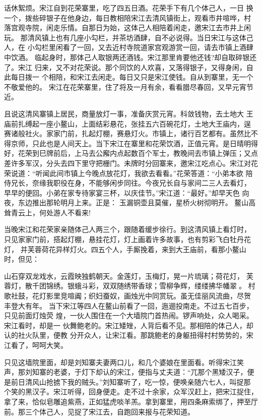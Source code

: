 话休絮烦。宋江自到花荣寨里，吃了四五日酒。花荣手下有几个体己人，一日
换一个，拨些碎银子在他身边，每日教相陪宋江去清风镇街上，观看市井喧哗，村
落宫观寺院，闲走乐情。自那日为始，这体己人相陪着闲走，邀宋江去市井上闲玩。
那清风镇上也有几座小勾栏，并茶坊酒肆，自不必说得。当日宋江与这体己人，在
小勾栏里闲看了一回，又去近村寺院道家宫观游赏一回，请去市镇上酒肆中饮酒。
临起身时，那体己人取银两还酒钱。宋江那里肯要他还钱?却自取碎银还了。宋江
归来，又不对花荣说。那个同饮的人欢喜，又落得银子，又得身闲，自此每日拨一
个相陪，和宋江去闲走。每日又只是宋江使钱。自从到寨里，无一个不敬爱他的。
宋江在花荣寨里，住了将及一月有余，看看腊尽春回，又早元宵节近。

且说这清风寨镇上居民，商量放灯一事，准备庆赏元宵。科敛钱物，去土地大
王庙前扎缚起一座小鳌山，上面结彩悬花，张挂五六百碗花灯，土地大王庙内，逞
赛诸般社火。家家门前，扎起灯棚，赛悬灯火。市镇上，诸行百艺都有。虽然比不
得京师，只此也是人间天上。当下宋江在寨里和花荣饮酒，正值元宵。是日晴明得
好，花荣到巳牌前后，上马去公廨内点起数百个军士，教晚间去市镇上弹压；又点
差许多军汉，分头去四下里守把栅门。未牌时分回寨来，邀宋江吃点心。宋江对花
荣说道：“听闻此间市镇上今晚点放花灯，我欲去看看。”花荣答道：“小弟本欲
陪侍兄长，奈缘我职役在身，不能够闲步同往。今夜兄长自与家间二三人去看灯，
早早的便回。小弟在家专待家宴三杯，以庆佳节。”宋江道：“最好。”却早天色
向夜，东边推出那轮明月上来。正是：
玉漏铜壶且莫催，星桥火树彻明开。
鳌山高耸青云上，何处游人不看来!

当晚宋江和花荣家亲随体己人两三个，跟随着缓步徐行。到这清风镇上看灯时，
只见家家门前，搭起灯棚，悬挂花灯，灯上画着许多故事，也有剪彩飞白牡丹花灯，
并芙蓉荷花异样灯火。四五个人，手厮挽着，来到大王庙前，看那小鳌山时，但见：

山石穿双龙戏水，云霞映独鹤朝天。金莲灯，玉梅灯，晃一片琉璃；荷花灯，
芙蓉灯，散千团锦绣。银蛾斗彩，双双随绣带香球；雪柳争辉，缕缕拂华幡翠。
村歌社鼓，花灯影里竞喧阗；织妇蚕奴，画烛光中同赏玩。虽无佳丽风流曲，尽贺
丰登大有年。
当下宋江等四人在鳌山前看了一回，迤逦投南走。不过五七百步，只见前面灯烛荧
煌，一伙人围住在一个大墙院门首热闹。锣声响处，众人喝采。宋江看时，却是一
伙舞鲍老的。宋江矮矬，人背后看不见。那相陪的体己人，却认的社火队里，便教
分开众人，让宋江看。那跳鲍老的身躯扭得村村势势的，宋江看了，呵呵大笑。

只见这墙院里面，却是刘知寨夫妻两口儿，和几个婆娘在里面看。听得宋江笑
声，那刘知寨的老婆，于灯下却认的宋江，便指与丈夫道：“兀那个黑矮汉子，便
是前日清风山抢掳下我的贼头。”刘知寨听了，吃一惊，便唤亲随六七人，叫捉那
个笑的黑汉子。宋江听得，回身便走。走不过十余家，众军汉赶上，把宋江捉住，
拿了来，恰似皂雕追紫燕，正如猛虎啖羊羔。拿到寨里，用四条麻索绑了，押至厅
前。那三个体己人，见捉了宋江去，自跑回来报与花荣知道。

